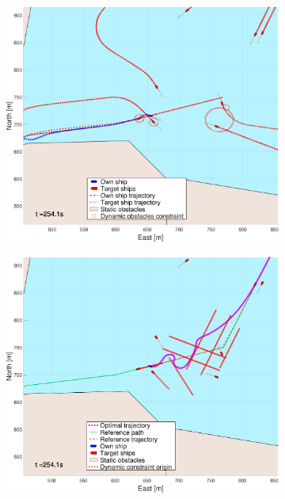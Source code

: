 \begin{figure}[!ht]
\begin{subfigure}[b]{0.494\textwidth}
        \subcaption{}
    \end{subfigure}
    \hfill
    \\
    \begin{subfigure}[b]{0.494\textwidth}
        \centering
        \includegraphics[width=\textwidth]{Images/NewFigures/Trheimfjord/_Simple_1fig1_time=255}
        \subcaption{}
    \end{subfigure}
    \hfill
    \begin{subfigure}[b]{0.494\textwidth}
        \centering
        \includegraphics[width=\textwidth]{Images/NewFigures/Trheimfjord/_Simple_1fig999_time=255}
        \subcaption{}
    \end{subfigure}
    \hfill
    \label{FIG: Fjord without pred}
\end{figure}%
